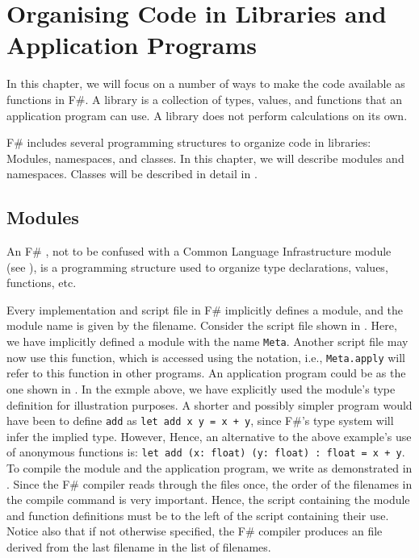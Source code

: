 \chapter{Organising Code in Libraries and Application Programs}
\label{chap:modules}
In this chapter, we will focus on a number of ways to make the code available as  functions in F\#. A library is a collection of types, values, and functions that an application program can use. A library does not perform calculations on its own.

F\# includes several programming structures to organize code in libraries: Modules, namespaces, and classes. In this chapter, we will describe modules and namespaces. Classes will be described in detail in .

\section{Modules}
\label{sec:modules}
An F\# , not to be confused with a Common Language Infrastructure module (see ), is a programming structure used to organize type declarations, values, functions, etc. 

Every implementation and script file in F\# implicitly defines a module, and the module name is given by the filename. Consider the script file  shown in .
%
%
Here, we have implicitly defined a module with the name \lstinline{Meta}. Another script file may now use this function, which is accessed using the  notation, i.e., \lstinline{Meta.apply} will refer to this function in other programs. An application program could be as the one shown in .
%
%
In the exmple above, we have explicitly used the module's type definition for illustration purposes. A shorter and possibly simpler program would have been to define \lstinline{add} as \lstinline{let add x y = x + y}, since F\#'s type system will infer the implied type. However,  Hence, an alternative to the above example's use of anonymous functions is: \lstinline{let add (x: float) (y: float) : float = x + y}. To compile the module and the application program, we write as demonstrated in .
%
%
Since the F\# compiler reads through the files once, the order of the filenames in the compile command is very important. Hence, the script containing the module and function definitions must be to the left of the script containing their use. Notice also that if not otherwise specified, the F\# compiler produces an  file derived from the last filename in the list of filenames.

